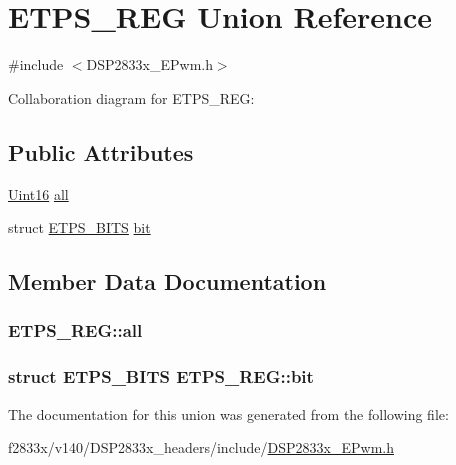 \hypertarget{union_e_t_p_s___r_e_g}{}\section{E\+T\+P\+S\+\_\+\+R\+E\+G Union Reference}
\label{union_e_t_p_s___r_e_g}


{\ttfamily \#include $<$D\+S\+P2833x\+\_\+\+E\+Pwm.\+h$>$}



Collaboration diagram for E\+T\+P\+S\+\_\+\+R\+E\+G\+:
\subsection*{Public Attributes}
\begin{DoxyCompactItemize}
\item 
\hyperlink{_d_s_p2833x___device_8h_a59a9f6be4562c327cbfb4f7e8e18f08b}{Uint16} \hyperlink{union_e_t_p_s___r_e_g_a22bf245310e24111e1e71439de6951aa}{all}
\item 
struct \hyperlink{struct_e_t_p_s___b_i_t_s}{E\+T\+P\+S\+\_\+\+B\+I\+T\+S} \hyperlink{union_e_t_p_s___r_e_g_ab7c8fb7b79918c074465d9a24d49e24d}{bit}
\end{DoxyCompactItemize}


\subsection{Member Data Documentation}
\hypertarget{union_e_t_p_s___r_e_g_a22bf245310e24111e1e71439de6951aa}{}
\subsubsection[{all}]{ E\+T\+P\+S\+\_\+\+R\+E\+G\+::all}\label{union_e_t_p_s___r_e_g_a22bf245310e24111e1e71439de6951aa}
\hypertarget{union_e_t_p_s___r_e_g_ab7c8fb7b79918c074465d9a24d49e24d}{}
\subsubsection[{bit}]{\setlength{\rightskip}{0pt plus 5cm}struct {\bf E\+T\+P\+S\+\_\+\+B\+I\+T\+S} E\+T\+P\+S\+\_\+\+R\+E\+G\+::bit}\label{union_e_t_p_s___r_e_g_ab7c8fb7b79918c074465d9a24d49e24d}


The documentation for this union was generated from the following file\+:\begin{DoxyCompactItemize}
\item 
f2833x/v140/\+D\+S\+P2833x\+\_\+headers/include/\hyperlink{_d_s_p2833x___e_pwm_8h}{D\+S\+P2833x\+\_\+\+E\+Pwm.\+h}\end{DoxyCompactItemize}
